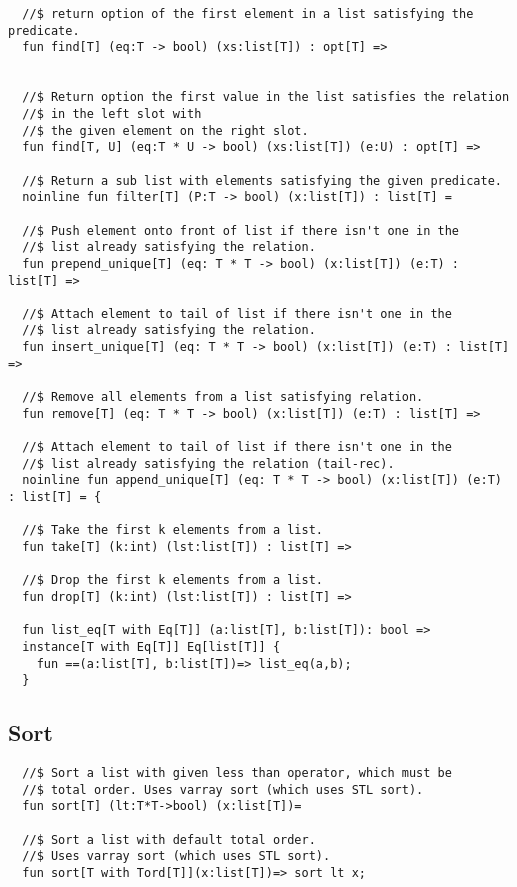 \documentclass[oneside]{book}
\begin{document}
{\begin{verbatim}
  //$ return option of the first element in a list satisfying the predicate.
  fun find[T] (eq:T -> bool) (xs:list[T]) : opt[T] =>


  //$ Return option the first value in the list satisfies the relation 
  //$ in the left slot with 
  //$ the given element on the right slot.
  fun find[T, U] (eq:T * U -> bool) (xs:list[T]) (e:U) : opt[T] =>

  //$ Return a sub list with elements satisfying the given predicate.
  noinline fun filter[T] (P:T -> bool) (x:list[T]) : list[T] =

  //$ Push element onto front of list if there isn't one in the
  //$ list already satisfying the relation.
  fun prepend_unique[T] (eq: T * T -> bool) (x:list[T]) (e:T) : list[T] =>

  //$ Attach element to tail of list if there isn't one in the
  //$ list already satisfying the relation.
  fun insert_unique[T] (eq: T * T -> bool) (x:list[T]) (e:T) : list[T] =>

  //$ Remove all elements from a list satisfying relation.
  fun remove[T] (eq: T * T -> bool) (x:list[T]) (e:T) : list[T] =>

  //$ Attach element to tail of list if there isn't one in the
  //$ list already satisfying the relation (tail-rec).
  noinline fun append_unique[T] (eq: T * T -> bool) (x:list[T]) (e:T) : list[T] = {

  //$ Take the first k elements from a list.
  fun take[T] (k:int) (lst:list[T]) : list[T] =>

  //$ Drop the first k elements from a list.
  fun drop[T] (k:int) (lst:list[T]) : list[T] =>
 
  fun list_eq[T with Eq[T]] (a:list[T], b:list[T]): bool =>
  instance[T with Eq[T]] Eq[list[T]] { 
    fun ==(a:list[T], b:list[T])=> list_eq(a,b); 
  } 
\end{verbatim}
 
\subsection{Sort}
\begin{verbatim}
  //$ Sort a list with given less than operator, which must be
  //$ total order. Uses varray sort (which uses STL sort).
  fun sort[T] (lt:T*T->bool) (x:list[T])=

  //$ Sort a list with default total order.
  //$ Uses varray sort (which uses STL sort).
  fun sort[T with Tord[T]](x:list[T])=> sort lt x;
\end{verbatim}
    
}
\end{document}
